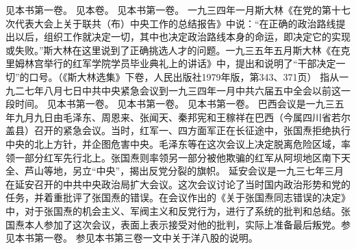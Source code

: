 \begin{maonote}
见本书第一卷。
见本卷。
见本书第一卷。
一九三四年一月斯大林《在党的第十七次代表大会上关于联共（布）中央工作的总结报告》中说：“在正确的政治路线提出以后，组织工作就决定一切，其中也决定政治路线本身的命运，即决定它的实现或失败。”斯大林在这里说到了正确挑选人才的问题。一九三五年五月斯大林《在克里姆林宫举行的红军学院学员毕业典礼上的讲话》中，提出和说明了“干部决定一切”的口号。（《斯大林选集》下卷，人民出版社1979年版，第343、371页）
指从一九二七年八月七日中共中央紧急会议到一九三四年一月中共六届五中全会以前这一段时间。
见本书第一卷。
见本书第一卷。
见本书第一卷。
巴西会议是一九三五年九月九日由毛泽东、周恩来、张闻天、秦邦宪和王稼祥在巴西（今属四川省若尔盖县）召开的紧急会议。当时，红军一、四方面军正在长征途中，张国焘拒绝执行中央的北上方针，并企图危害中央。毛泽东等在这次会议上决定脱离危险区域，率领一部分红军先行北上。张国焘则率领另一部分被他欺骗的红军从阿坝地区南下天全、芦山等地，另立“中央”，揭出反党分裂的旗帜。
延安会议是一九三七年三月在延安召开的中共中央政治局扩大会议。这次会议讨论了当时国内政治形势和党的任务，并着重批评了张国焘的错误。在会议作出的《关于张国焘同志错误的决定》中，对于张国焘的机会主义、军阀主义和反党行为，进行了系统的批判和总结。张国焘本人参加了这次会议，表面上表示接受对他的批判，实际上准备最后叛党。参见本书第一卷。
参见本书第三卷一文中关于洋八股的说明。
\end{maonote}
